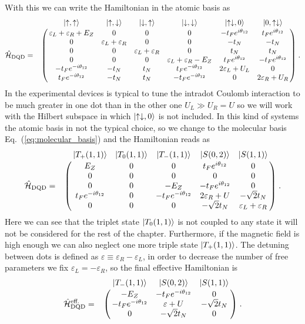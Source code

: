 With this we can write the Hamiltonian in the atomic basis as
\begin{equation}
	\hat{\mathcal{H}}_{\text{DQD}}=\bordermatrix{~ & \ket{\uparrow,\uparrow} & \ket{\uparrow,\downarrow} & \ket{\downarrow,\uparrow} & \ket{\downarrow,\downarrow} & \ket{\uparrow\downarrow,0} & \ket{0,\uparrow\downarrow}\cr
		~ & \varepsilon_L+\varepsilon_R+E_Z & 0 & 0 & 0 & -t_Fe^{i\theta_{12}} & t_Fe^{i\theta_{12}} \cr
		~ & 0 & \varepsilon_L+\varepsilon_R & 0 & 0 & -t_N & -t_N\cr
		~ & 0 & 0 & \varepsilon_L+\varepsilon_R & 0 & t_N & t_N\cr
		~ & 0 & 0 & 0 & \varepsilon_L+\varepsilon_R -E_Z & t_Fe^{i\theta_{12}} & -t_Fe^{i\theta_{12}}\cr
		~ & -t_Fe^{-i\theta_{12}} & -t_N & t_N & t_Fe^{-i\theta_{12}} &  2\varepsilon_L+U_L & 0 \cr
		~ & t_Fe^{-i\theta_{12}} & -t_N & t_N & -t_Fe^{-i\theta_{12}} &  0 & 2\varepsilon_R+U_R \cr}\; .
\end{equation}
In the experimental devices is typical to tune the intradot Coulomb interaction to be much greater in one dot than in the other one $U_L\gg U_R=U$ so we will work with the Hilbert subspace in which $\ket{\uparrow\downarrow,0}$ is not included. In this kind of systems the atomic basis in not the typical choice, so we change to the molecular basis Eq.~(\ref{eq:molecular_basis}) and the Hamiltonian reads as
\begin{equation}
\hat{\mathcal{H}}_{\text{DQD}}=\bordermatrix{~ & \ket{T_+(1,1)} & \ket{T_0(1,1)} & \ket{T_-(1,1)} & \ket{S(0,2)} & \ket{S(1,1)}\cr
	~ & E_Z & 0 & 0 & t_Fe^{i\theta_{12}} & 0 \cr
	~ & 0 & 0 & 0 & 0 & 0\cr
	~ & 0 & 0 & -E_Z & -t_Fe^{i\theta_{12}} & 0 \cr
	~ & t_Fe^{-i\theta_{12}} & 0 & -t_Fe^{-i\theta_{12}} & 2\varepsilon_R+U & -\sqrt{2}t_N \cr
	~ & 0 & 0 & 0 & -\sqrt{2}t_N &  \varepsilon_L+\varepsilon_R  \cr}\; .
\label{eq:Hamiltonain_DQD_2HH_Full}
\end{equation}
Here we can see that the triplet state $\ket{T_0(1,1)}$ is not coupled to any state it will not be considered for the rest of the chapter. Furthermore, if the magnetic field is high enough we can also neglect one more triple state $\ket{T_+(1,1)}$. The detuning between dots is defined as $\varepsilon\equiv \varepsilon_R-\varepsilon_L$, in order to decrease the number of free parameters we fix $\varepsilon_L=-\varepsilon_R$, so the final effective Hamiltonian is
\begin{equation}
\hat{\mathcal{H}}_{\text{DQD}}^{\text{eff.}}=\bordermatrix{~ & \ket{T_-(1,1)} & \ket{S(0,2)} & \ket{S(1,1)}\cr
	~ & -E_Z & -t_Fe^{-i\theta_{12}} & 0 \cr
	~ & -t_Fe^{-i\theta_{12}} & \varepsilon +U & -\sqrt{2}t_N \cr
	~ & 0 & -\sqrt{2}t_N &  0  \cr}\; .
\label{eq:effective_Hamiltonian_DQD}
\end{equation}
